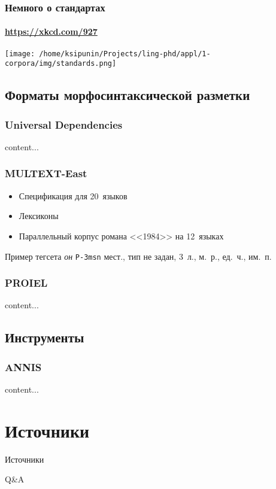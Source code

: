 \begin{frame}
    \frametitle{Немного о стандартах}
    \framesubtitle{\url{https://xkcd.com/927}}
    \centering
    \texttt{[image: /home/ksipunin/Projects/ling-phd/appl/1-corpora/img/standards.png]}
\end{frame}

\subsection{Форматы морфосинтаксической разметки}


\begin{frame}
    \frametitle{Universal Dependencies}
    content...
\end{frame}

\begin{frame}
    \frametitle{MULTEXT-East}

    \begin{itemize}
        \item Спецификация для 20~языков \autocite{erjavec:2021}
        \item Лексиконы
        \item Параллельный корпус романа <<1984>> на 12~языках
    \end{itemize}

    \vfill

    \begin{block}{Пример тегсета}
        \textit{он} \linebreak \texttt{P-3msn} \linebreak мест., тип не задан, 3~л., м.~р., ед.~ч., им.~п.
    \end{block}
\end{frame}

\begin{frame}
    \frametitle{PROIEL}
    content...
\end{frame}

\subsection{Инструменты}


\begin{frame}
    \frametitle{ANNIS}
    content...
\end{frame}


\section{Источники}

\frame{\tableofcontents[currentsection]}

\begin{frame}{Источники}
    \nocite{*}
    \printbibliography
\end{frame}

\begin{frame}{}
    \centering

    \vfill
    Q\&A
    \vfill
\end{frame}



